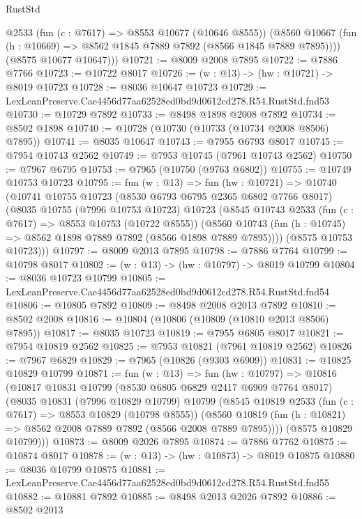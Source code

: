 \begin{lexlean}{RustStd}
\begin{coremodule}
          @2533
          (fun (c : @7617) => @8553 @10677 (@10646 @8555))
          (@8560 @10667 (fun (h : @10669) => @8562 @1845 @7889 @7892 (@8566 @1845 @7889 @7895))))
        (@8575 @10677 @10647)))
@10721 := @8009 @2008 @7895
@10722 := @7886 @7766
@10723 := @10722 @8017
@10726 := (w : @13) -> (hw : @10721) -> @8019 @10723
@10728 := @8036 @10647 @10723
@10729 := LexLeanPreserve.Cae4456d77aa62528ed0bd9d0612cd278.R54.RustStd.fnd53
@10730 := @10729 @7892
@10733 := @8498 @1898 @2008 @7892
@10734 := @8502 @1898
@10740 := @10728 (@10730 (@10733 (@10734 @2008 @8506) @7895))
@10741 := @8035 @10647
@10743 := @7955 @6793 @8017
@10745 := @7954 @10743 @2562
@10749 := @7953 @10745 (@7961 @10743 @2562)
@10750 := @7967 @6795
@10753 := @7965 (@10750 (@9763 @6802))
@10755 := @10749 @10753 @10723
@10795 := fun (w : @13) =>
  fun (hw : @10721) =>
  @10740
    (@10741
      @10755
      @10723
      (@8530 @6793 @6795 @2365 @6802 @7766 @8017)
      (@8035
        @10755
        (@7996 @10753 @10723)
        @10723
        (@8545
          @10743
          @2533
          (fun (c : @7617) => @8553 @10753 (@10722 @8555))
          (@8560 @10743 (fun (h : @10745) => @8562 @1898 @7889 @7892 (@8566 @1898 @7889 @7895))))
        (@8575 @10753 @10723)))
@10797 := @8009 @2013 @7895
@10798 := @7886 @7764
@10799 := @10798 @8017
@10802 := (w : @13) -> (hw : @10797) -> @8019 @10799
@10804 := @8036 @10723 @10799
@10805 := LexLeanPreserve.Cae4456d77aa62528ed0bd9d0612cd278.R54.RustStd.fnd54
@10806 := @10805 @7892
@10809 := @8498 @2008 @2013 @7892
@10810 := @8502 @2008
@10816 := @10804 (@10806 (@10809 (@10810 @2013 @8506) @7895))
@10817 := @8035 @10723
@10819 := @7955 @6805 @8017
@10821 := @7954 @10819 @2562
@10825 := @7953 @10821 (@7961 @10819 @2562)
@10826 := @7967 @6829
@10829 := @7965 (@10826 (@9303 @6909))
@10831 := @10825 @10829 @10799
@10871 := fun (w : @13) =>
  fun (hw : @10797) =>
  @10816
    (@10817
      @10831
      @10799
      (@8530 @6805 @6829 @2417 @6909 @7764 @8017)
      (@8035
        @10831
        (@7996 @10829 @10799)
        @10799
        (@8545
          @10819
          @2533
          (fun (c : @7617) => @8553 @10829 (@10798 @8555))
          (@8560 @10819 (fun (h : @10821) => @8562 @2008 @7889 @7892 (@8566 @2008 @7889 @7895))))
        (@8575 @10829 @10799)))
@10873 := @8009 @2026 @7895
@10874 := @7886 @7762
@10875 := @10874 @8017
@10878 := (w : @13) -> (hw : @10873) -> @8019 @10875
@10880 := @8036 @10799 @10875
@10881 := LexLeanPreserve.Cae4456d77aa62528ed0bd9d0612cd278.R54.RustStd.fnd55
@10882 := @10881 @7892
@10885 := @8498 @2013 @2026 @7892
@10886 := @8502 @2013

\end{coremodule}
\end{lexlean}
